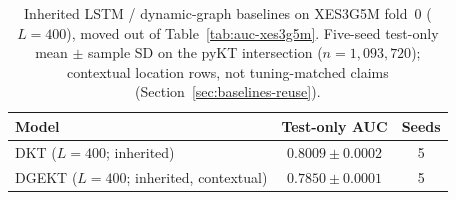 \begin{table}[tbp]
\caption{Inherited LSTM / dynamic-graph baselines on XES3G5M fold~0
($L{=}400$), moved out of Table~\ref{tab:auc-xes3g5m}. Five-seed
test-only mean $\pm$ sample SD on the pyKT intersection
($n{=}1{,}093{,}720$); contextual location rows, not tuning-matched
claims (Section~\ref{sec:baselines-reuse}).}
\label{tab:auc-inherited}
\centering
\footnotesize
\begin{tabular}{@{}lcc@{}}
\toprule
Model & Test-only AUC & Seeds \\
\midrule
DKT ($L{=}400$; inherited) & $0.8009{\pm}0.0002$ & 5 \\
DGEKT ($L{=}400$; inherited, contextual) & $0.7850{\pm}0.0001$ & 5 \\
\bottomrule
\end{tabular}
\end{table}
